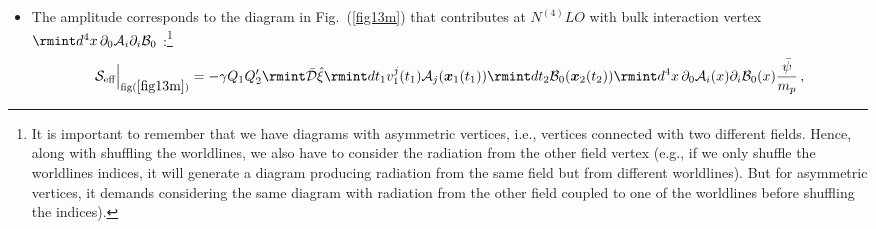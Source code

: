 \begin{itemize}
\begin{align}
   &=\frac{\gamma Q_1Q_2'}{2\pi}\rmint dt \Bigg[(\Vec{a}_2\cdot \Hat{n})\Big\{\frac{  e^{-\mu_{\gamma} r}}{2 \mu_{\gamma} \,r}-\frac{1 -  e^{-\mu_{\gamma} r}}{2\, \mu_{\gamma}^2\, r^2}\Big\}+v_2^2 \,\frac{e^{-r \mu _{\gamma }} \left(-r \mu _{\gamma }+e^{r \mu _{\gamma }}-1\right)}{  r^3 \mu _{\gamma }^2}\notag\\
   &
\,\,\,\,\,\,\,\,\,\,\,\,\,\,\,\,\,\,\,\,\,\,\,\,\,\,\,\,\,
(\boldsymbol{v}_2\cdot \Hat{n})^2\,\frac{e^{-r \mu _{\gamma }} \Big(r \mu _{\gamma } \left(r \mu _{\gamma }+3\right)-3 e^{r \mu _{\gamma }}+3\Big)}{  r^3 \mu _{\gamma }^2}
\Bigg]\Big(\frac{\Bar{\psi}(\boldsymbol{x}_1(t))}{m_p}+\frac{\Bar{\psi}(\boldsymbol{x}_2(t))}{m_p}\Big)\notag\\
   &\quad +(1\leftrightarrow 2)\,\sim\mathcal{O}(L^{1/2}v^{9/2}).
\end{align}
\vspace{-0.7cm}
\item  The amplitude corresponds to the diagram in Fig.~(\ref{fig13m}) that contributes at $N^{(4)}LO$ with bulk interaction vertex $\rmint d^4x\,\partial_0\mathcal{A}_i\partial_i\mathcal{B}_0$ :\footnote{It is important to remember that we have diagrams with asymmetric vertices, i.e., vertices connected with two different fields. Hence, along with shuffling the worldlines, we also have to consider the radiation from the other field vertex (e.g., if we only shuffle the worldlines indices, it will generate a diagram producing radiation from the same field but from different worldlines). But for asymmetric vertices, it demands considering the same diagram with radiation from the other field coupled to one of the worldlines before shuffling the indices).}
\begin{align}
   \mathcal{S}_{\text{eff}}\Big |_{{\text{fig}(\ref{fig13m})}}
   &=-\gamma Q_1Q_2'\rmint \Bar{\mathcal{D}}\hat{\xi}\rmint dt_1v_1^j(t_1)\mathcal{A}_j(\boldsymbol{x}_1(t_1))\rmint dt_2\mathcal{B}_0(\boldsymbol{x}_2(t_2))\rmint d^4x\,\partial_0\mathcal{A}_i(x)\partial_i\mathcal{B}_0(x)\frac{\Bar{\psi}}{m_p}\,,\notag\\

\end{align}
\end{itemize}
